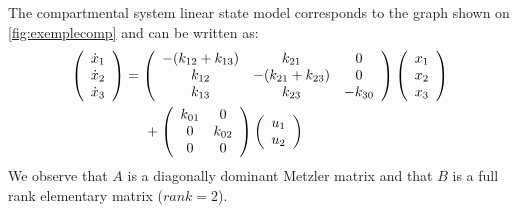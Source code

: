 \begin{exemple}
The compartmental system linear state model corresponds to the graph shown on \ref{fig:exemplecomp} 
and can be written as:
\begin{equation} \begin{split}
\bma{c} \dot x_1 \\ \dot x_2 \\ \dot x_3 \ema &= 
\bma{ccc} -(k_{12} + k_{13}) & k_{21} & 0 \\ 
k_{12} & -(k_{21} + k_{23}) & 0 \\ k_{13} & k_{23} & - k_{30} \ema
\bma{c} x_1 \\ x_2 \\ x_3 \ema \\ &\hd
+ \bma{cc} k_{01} & 0 \\ 0 & k_{02} \\ 0 & 0 \ema
\bma{c} u_1 \\ u_2 \ema
\end{split} \end{equation}
We observe that $A$ is a diagonally dominant Metzler matrix and that $B$ is a full rank elementary matrix ($rank = 2$).
\cqfd
\end{exemple}

